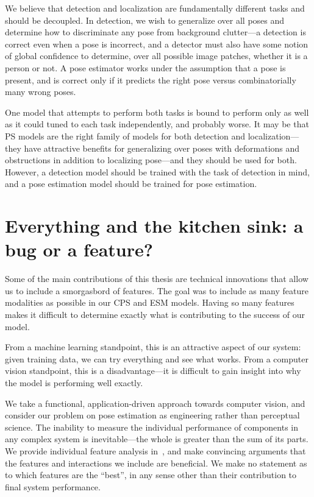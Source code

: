 We believe that detection and localization are fundamentally different tasks 
and should be decoupled.  In detection, we wish to generalize over all poses 
and determine how to discriminate any pose from background clutter---a 
detection is correct even when a pose is incorrect, and a detector must also 
have some notion of global confidence to determine, over all possible image 
patches, whether it is a person or not.  A pose estimator works under the 
assumption that a pose is present, and is correct only if it predicts the right 
pose versus combinatorially many wrong poses.

One model that attempts to perform both tasks is bound to perform only as well 
as it could tuned to each task independently, and probably worse.  It may be 
that PS models are the right family of models for both detection and 
localization---they have attractive benefits for generalizing over poses with 
deformations and obstructions in addition to localizing pose---and they should 
be used for both.  However, a detection model should be trained with the task 
of detection in mind, and a pose estimation model should be trained for pose 
estimation. 

\section{Everything and the kitchen sink: a bug or a feature?}
Some of the main contributions of this thesis are technical innovations that 
allow us to include a smorgasbord of features.  The goal was to include as many 
feature modalities as possible in our CPS and ESM models.  Having so many 
features makes it difficult to determine exactly what is contributing to the 
success of our model.  

From a machine learning standpoint, this is an attractive aspect of our system: 
given training data, we can try everything and see what works.  From a computer 
vision standpoint, this is a disadvantage---it is difficult to gain insight 
into why the model is performing well exactly.

We take a functional, application-driven approach towards computer vision, and 
consider our problem on pose estimation as engineering rather than perceptual 
science.  The inability to measure the individual performance of components in 
any complex system is inevitable---the whole is greater than the sum of its 
parts.  We provide individual feature analysis in~, and make 
convincing arguments that the features and interactions we include are 
beneficial.  We make no statement as to which features are the ``best'', in any 
sense other than their contribution to final system performance.

